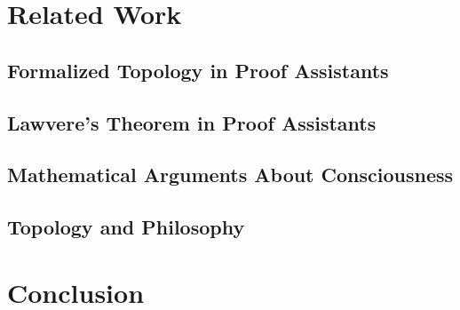 \documentclass[11pt]{article}
\begin{document}
\section{Related Work}
\label{sec:related}


\subsection{Formalized Topology in Proof Assistants}

\subsection{Lawvere's Theorem in Proof Assistants}

\subsection{Mathematical Arguments About Consciousness}

\subsection{Topology and Philosophy}

\section{Conclusion}
\label{sec:conclusion}
\end{document}
